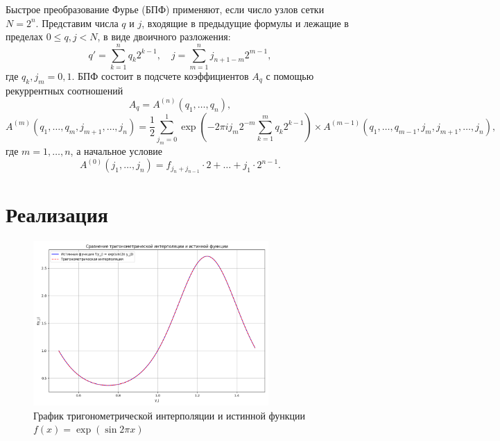 \documentclass[a4paper, 14pt]{extarticle}
\begin{document}
Быстрое преобразование Фурье (БПФ) применяют, если число узлов сетки \( N = 2^n \). Представим числа \( q \) и \( j \), входящие в предыдущие формулы и лежащие в пределах \( 0 \leq q, j < N \), в виде двоичного разложения:
\[
q' = \sum_{k=1}^{n} q_k 2^{k-1}, \quad j = \sum_{m=1}^{n} j_{n+1-m} 2^{m-1},
\]
где \( q_k, j_m = 0, 1 \). БПФ состоит в подсчете коэффициентов \( A_q \) с помощью рекуррентных соотношений
\[
A_q = A^{(n)} (q_1, \ldots, q_n),
\]
\[
A^{(m)} (q_1, \ldots, q_m, j_{m+1}, \ldots, j_n) = \frac{1}{2} \sum_{j_m=0}^{1} \exp\left(-2\pi i j_m 2^{-m} \sum_{k=1}^{m} q_k 2^{k-1}\right) \times A^{(m-1)} (q_1, \ldots, q_{m-1}, j_m, j_{m+1}, \ldots, j_n),
\]
где \( m = 1, \ldots, n \), а начальное условие
\[
A^{(0)}(j_1, \ldots, j_n) = f_{j_n + j_{n-1}} \cdot 2 + \ldots + j_1 \cdot 2^{n-1}.
\]

\section{Реализация}




\begin{figure}[H]
    \centering
    \includegraphics[width=0.8\textwidth]{images/fft.png}
    \caption{График тригонометрической интерполяции и истинной функции \( f(x) = \exp(\sin 2\pi x) \)}
    \label{fig:graph}
\end{figure}
\end{document}
